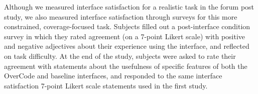 \documentclass[12pt,twoside]{mitthesis}
\providecommand{\DIFaddtex}[1]{{\protect\color{blue}\uwave{#1}}} %
\providecommand{\DIFaddbegin}{} %
\providecommand{\DIFaddend}{} %
\providecommand{\DIFdelbegin}{} %
\providecommand{\DIFdelend}{} %
\providecommand{\DIFadd}[1]{\texorpdfstring{\DIFaddtex{#1}}{#1}} %
\begin{document}
\DIFdelbegin %

\DIFdelend \DIFaddbegin {\bf \DIFadd{Surveys}} \DIFaddend Although we measured interface satisfaction for a realistic task in the forum post study, we also measured interface satisfaction through surveys for this more constrained, coverage-focused task. Subjects filled out a post-interface condition survey in which they rated agreement (on a 7-point Likert scale) with positive and negative adjectives about their experience using the interface, and reflected on task difficulty. At the end of the study, subjects were asked to rate their agreement with statements about the usefulness of specific features of both the OverCode and baseline interfaces, and responded to the same interface satisfaction 7-point Likert scale statements used in the first study.
\end{document}
